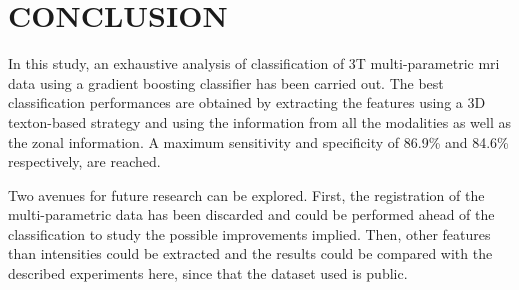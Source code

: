 \section{CONCLUSION}\label{sec:conclusion}

In this study, an exhaustive analysis of classification of 3T multi-parametric \ac{mri} data using a gradient boosting classifier has been carried out. The best classification performances are obtained by extracting the features using a 3D texton-based strategy and using the information from all the modalities as well as the zonal information. A maximum sensitivity and specificity of 86.9\% and 84.6\% respectively, are reached.

Two avenues for future research can be explored. First, the registration of the multi-parametric data has been discarded and could be performed ahead of the classification to study the possible improvements implied. Then, other features than intensities could be extracted and the results could be compared with the described experiments here, since that the dataset used is public.

